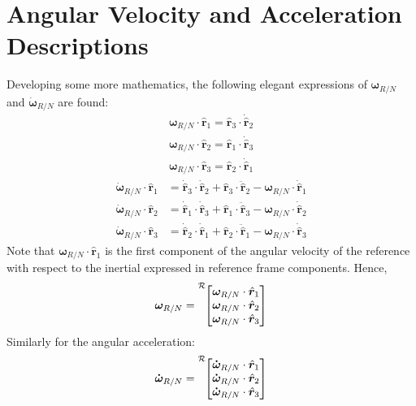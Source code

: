 \documentclass[]{AVSSimReportMemo}
\begin{document}
\section{Angular Velocity and Acceleration Descriptions}
Developing some more mathematics, the following elegant expressions of $\bm\omega_{R/N}$ and $\dot{\bm\omega}_{R/N}$ are found:
\begin{subequations}
	\begin{align}
		\bm\omega_{R/N} \cdot \hat{\bm r}_{1}  = \hat{\bm r}_{3} \cdot \dot{\hat{\bm r}}_{2}  \\
		\bm\omega_{R/N} \cdot \hat{\bm r}_{2} = \hat{\bm r}_{1} \cdot \dot{\hat{\bm r}}_{3}\\
		\bm\omega_{R/N} \cdot \hat{\bm r}_{3} = \hat{\bm r}_{2} \cdot \dot{\hat{\bm r}}_{1}
	\end{align}
\end{subequations}
\begin{subequations}
	\begin{align}
		\dot{\bm\omega}_{R/N} \cdot \hat{\bm r}_{1} &=  
		\dot{\hat{\bm r}}_{3} \cdot \dot{\hat{\bm r}}_{2} + \hat{\bm r}_{3} \cdot \ddot{\hat{\bm r}}_{2} -  \bm\omega_{R/N} \cdot \dot{\hat{\bm r}}_{1}
		\\
		\dot{\bm\omega}_{R/N} \cdot \hat{\bm r}_{2} &= 
		 \dot{\hat{\bm r}}_{1} \cdot \dot{\hat{\bm r}}_{3} + \hat{\bm r}_{1} \cdot \ddot{\hat{\bm r}}_{3} -  \bm\omega_{R/N} \cdot \dot{\hat{\bm r}}_{2}	
		\\
		\dot{\bm\omega}_{R/N} \cdot \hat{\bm r}_{3} &=  
		\dot{\hat{\bm r}}_{2} \cdot \dot{\hat{\bm r}}_{1} + \hat{\bm r}_{2} \cdot \ddot{\hat{\bm r}}_{1} -  \bm\omega_{R/N} \cdot \dot{\hat{\bm r}}_{3}
	\end{align}
\end{subequations}
Note that $\bm\omega_{R/N} \cdot \hat{\bm r}_{1}$ is the first component of the angular velocity of the reference with respect to the inertial expressed in reference frame components. Hence,
\begin{equation}
	\bm\omega_{R/N}= \leftexp{R}{
		\begin{bmatrix}
			\bm\omega_{R/N} \cdot \hat{\bm r}_{1} \\
			\bm\omega_{R/N} \cdot \hat{\bm r}_{2}  \\
			\bm\omega_{R/N} \cdot \hat{\bm r}_{3} 
		\end{bmatrix}
	}
\end{equation}
Similarly for the angular acceleration:
\begin{equation}
	\bm{\dot\omega}_{R/N} = \leftexp{R}{
		\begin{bmatrix}
			\bm{\dot\omega}_{R/N} \cdot \hat{\bm r}_{1} \\
			\bm{\dot\omega}_{R/N} \cdot \hat{\bm r}_{2}  \\
			\bm{\dot\omega}_{R/N} \cdot \hat{\bm r}_{3} 
		\end{bmatrix}
	}
\end{equation}
\end{document}
